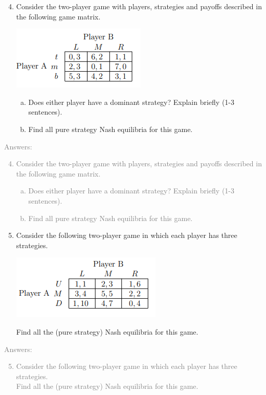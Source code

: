 \documentclass[11pt]{article}
\begin{document}
\begin{enumerate}
	\setcounter{enumi}{3}
	\item  Consider the two-player game with players, strategies and payoffs described in the following game matrix.
	\begin{center}
		\includegraphics[scale=1.0]{Figure1.2}
	\end{center}
	\begin{enumerate}[(a)]
		\item Does either player have a dominant strategy? Explain briefly (1-3 sentences).
		\item Find all pure strategy Nash equilibria for this game.
	\end{enumerate}
\end{enumerate}
\textcolor{gray}{
Answers:
\begin{enumerate}
	\setcounter{enumi}{3}
	\item  Consider the two-player game with players, strategies and payoffs described in the following game matrix.
	\begin{enumerate}[(a)]
		\item Does either player have a dominant strategy? Explain briefly (1-3 sentences).
		\item Find all pure strategy Nash equilibria for this game.
	\end{enumerate}
\end{enumerate}
}

\begin{enumerate}
	\setcounter{enumi}{4}
	\item Consider the following two-player game in which each player has three strategies.\\
	\begin{center}
		\includegraphics[scale=1.0]{Figure1.3}\\
	\end{center}
	Find all the (pure strategy) Nash equilibria for this game.\\
\end{enumerate}
\textcolor{gray}{
Answers:
\begin{enumerate}
	\setcounter{enumi}{4}
	\item Consider the following two-player game in which each player has three strategies.\\
	Find all the (pure strategy) Nash equilibria for this game.\\
\end{enumerate}
}
\end{document}

